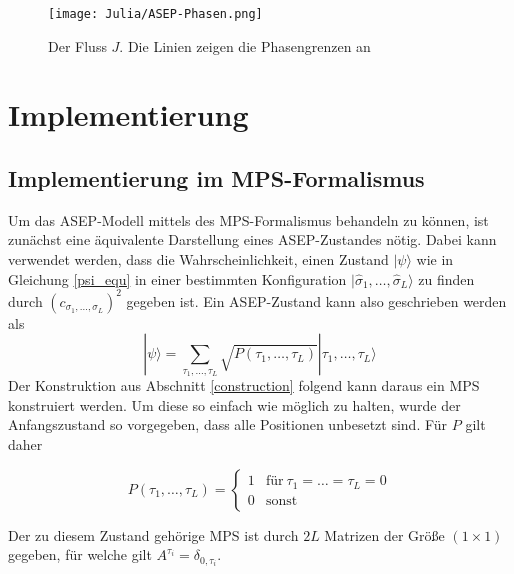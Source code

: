 \documentclass[10pt,a4paper]{report}
\newcommand{\SumIndex}{\sigma_1,\ldots,\sigma_L}
\newcommand{\SumIndexTau}{\tau_1,\ldots,\tau_L}
\begin{document}
\begin{figure}
\begin{center}
\texttt{[image: Julia/ASEP-Phasen.png]}
\caption{Der Fluss $J$. Die Linien zeigen die Phasengrenzen an}
\end{center}
\end{figure}

 

\chapter{Implementierung}
\section{Implementierung im MPS-Formalismus}

Um das ASEP-Modell mittels des MPS-Formalismus behandeln zu können, ist zunächst eine äquivalente Darstellung eines ASEP-Zustandes nötig. Dabei kann verwendet werden, dass die Wahrscheinlichkeit, einen Zustand $|\psi\rangle$ wie in Gleichung \ref{psi_equ} in einer bestimmten Konfiguration $|\hat{\sigma}_1,\ldots,\hat{\sigma}_L\rangle$ zu finden durch $(c_{\SumIndex})^2$ gegeben ist. Ein ASEP-Zustand kann also geschrieben werden als
\begin{equation}
|\psi\rangle=\sum_{\SumIndexTau} \sqrt{P(\SumIndexTau)}|\SumIndexTau\rangle
\end{equation}
Der Konstruktion aus Abschnitt \ref{construction} folgend kann daraus ein MPS konstruiert werden. Um diese so einfach wie möglich zu halten, wurde der Anfangszustand so vorgegeben, dass alle Positionen unbesetzt sind. Für $P$ gilt daher

\begin{equation}
P(\tau_1,\ldots,\tau_L)=
\begin{cases}
1 & \text{für}\ \tau_1=\ldots=\tau_L=0\\
0 & \text{sonst}
\end{cases}
\end{equation}

Der zu diesem Zustand gehörige MPS ist durch $2L$ Matrizen der Größe $(1\times 1)$ gegeben, für welche gilt $A^{\tau_i}=\delta_{0,\tau_i}$. \par
\end{document}
